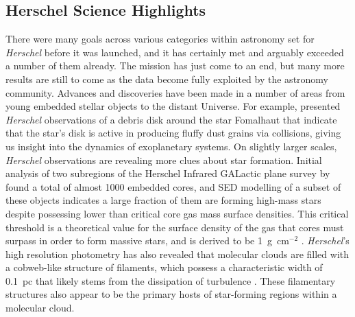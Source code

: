 \subsection{Herschel Science Highlights} \label{herschel_sci}
There were many goals across various categories within astronomy set for \emph{Herschel} before it was launched, and it has certainly met and arguably exceeded a number of them already.  The mission has just come to an end, but many more results are still to come as the data become fully exploited by the astronomy community.  Advances and discoveries have been made in a number of areas from young embedded stellar objects to the distant Universe.  For example, \citet{2012A&A...540A.125A} presented \emph{Herschel} observations of a debris disk around the star Fomalhaut that indicate that the star's disk is active in producing fluffy dust grains via collisions, giving us insight into the dynamics of exoplanetary systems.  On slightly larger scales, \emph{Herschel} observations are revealing more clues about star formation.  Initial analysis of two subregions of the Herschel Infrared GALactic plane survey \citep[Hi-Gal; ][]{2010PASP..122..314M, 2010A&A...518L.100M} by \citet{2010A&A...518L..97E} found a total of almost 1000 embedded cores, and SED modelling of a subset of these objects indicates a large fraction of them are forming high-mass stars despite possessing lower than critical core gas mass surface densities.  This critical threshold is a theoretical value for the surface density of the gas that cores must surpass in order to form massive stars, and is derived to be 1~g~cm$^{-2}$ \citep{2008Natur.451.1082K}.  \emph{Herschel}'s high resolution photometry has also revealed that molecular clouds are filled with a cobweb-like structure of filaments, which possess a characteristic width of 0.1~pc that likely stems from the dissipation of turbulence \citep{2011A&A...529L...6A}.  These filamentary structures also appear to be the primary hosts of star-forming regions within a molecular cloud.

